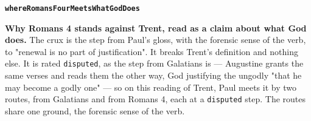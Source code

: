 \documentclass[11pt]{article}
\begin{document}
\par\medskip\noindent\textbf{\texttt{where\allowbreak{}Romans\allowbreak{}Four\allowbreak{}Meets\allowbreak{}What\allowbreak{}God\allowbreak{}Does}}\par\nobreak\noindent
\textbf{Why Romans 4 stands against Trent, read as a claim about what God does.} The crux is the step from Paul's gloss, with the forensic sense of the verb, to "renewal is no part of justification". It breaks Trent's definition and nothing else. It is rated \texttt{disputed}, as the step from Galatians is — Augustine grants the same verses and reads them the other way, God justifying the ungodly "that he may become a godly one" — so on this reading of Trent, Paul meets it by two routes, from Galatians and from Romans 4, each at a \texttt{disputed} step. The routes share one ground, the forensic sense of the verb.
\end{document}
